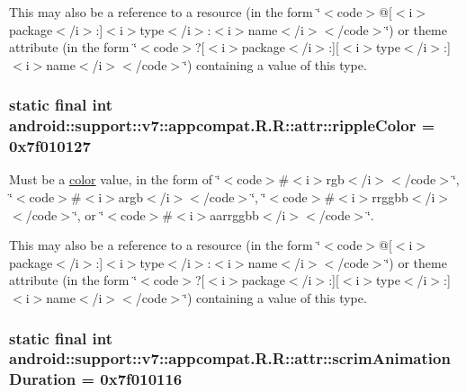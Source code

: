This may also be a reference to a resource (in the form \char`\"{}$<$code$>$@\mbox{[}$<$i$>$package$<$/i$>$:\mbox{]}$<$i$>$type$<$/i$>$:$<$i$>$name$<$/i$>$$<$/code$>$\char`\"{}) or theme attribute (in the form \char`\"{}$<$code$>$?\mbox{[}$<$i$>$package$<$/i$>$:\mbox{]}\mbox{[}$<$i$>$type$<$/i$>$:\mbox{]}$<$i$>$name$<$/i$>$$<$/code$>$\char`\"{}) containing a value of this type. \hypertarget{classandroid_1_1support_1_1v7_1_1appcompat_1_1_r_1_1attr_b3060f739ffcc4cc769dd6b7f08a4582}{
\subsubsection[{rippleColor}]{\setlength{\rightskip}{0pt plus 5cm}static final int android::support::v7::appcompat.R.R::attr::rippleColor = 0x7f010127}}
\label{classandroid_1_1support_1_1v7_1_1appcompat_1_1_r_1_1attr_b3060f739ffcc4cc769dd6b7f08a4582}


Must be a \hyperlink{classandroid_1_1support_1_1v7_1_1appcompat_1_1_r_1_1color}{color} value, in the form of \char`\"{}$<$code$>$\#$<$i$>$rgb$<$/i$>$$<$/code$>$\char`\"{}, \char`\"{}$<$code$>$\#$<$i$>$argb$<$/i$>$$<$/code$>$\char`\"{}, \char`\"{}$<$code$>$\#$<$i$>$rrggbb$<$/i$>$$<$/code$>$\char`\"{}, or \char`\"{}$<$code$>$\#$<$i$>$aarrggbb$<$/i$>$$<$/code$>$\char`\"{}. 

This may also be a reference to a resource (in the form \char`\"{}$<$code$>$@\mbox{[}$<$i$>$package$<$/i$>$:\mbox{]}$<$i$>$type$<$/i$>$:$<$i$>$name$<$/i$>$$<$/code$>$\char`\"{}) or theme attribute (in the form \char`\"{}$<$code$>$?\mbox{[}$<$i$>$package$<$/i$>$:\mbox{]}\mbox{[}$<$i$>$type$<$/i$>$:\mbox{]}$<$i$>$name$<$/i$>$$<$/code$>$\char`\"{}) containing a value of this type. \hypertarget{classandroid_1_1support_1_1v7_1_1appcompat_1_1_r_1_1attr_276a9e1454534082f94d1e432cde455f}{
\subsubsection[{scrimAnimationDuration}]{\setlength{\rightskip}{0pt plus 5cm}static final int android::support::v7::appcompat.R.R::attr::scrimAnimationDuration = 0x7f010116}}
\label{classandroid_1_1support_1_1v7_1_1appcompat_1_1_r_1_1attr_276a9e1454534082f94d1e432cde455f}



